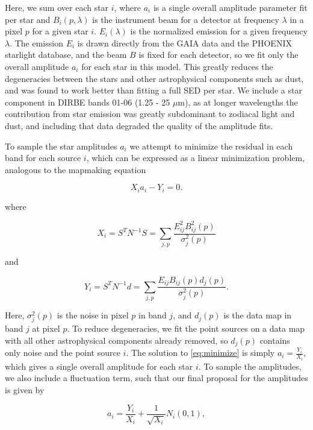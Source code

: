 \documentclass{aa}
\begin{document}
Here, we sum over each star $i$, where $a_i$ is a single overall amplitude parameter fit per star and $B_i(p, \lambda)$ is the instrument beam for a detector at frequency $\lambda$ in a pixel $p$ for a given star $i$. $E_i(\lambda)$ is the normalized emission for a given frequency $\lambda$. The emission $E_i$ is drawn directly from the GAIA data and the PHOENIX starlight database, and the beam $B$ is fixed for each detector, so we fit only the overall amplitude $a_i$ for each star in this model. This greatly reduces the degeneracies between the stars and other astrophysical components such as dust, and was found to work better than fitting a full SED per star. We include a star component in DIRBE bands 01-06 (1.25 - 25 $\mu$m), as at longer wavelengths the contribution from star emission was greatly subdominant to zodiacal light and dust, and including that data degraded the quality of the amplitude fits. 

To sample the star amplitudes $a_i$ we attempt to minimize the residual in each band for each source $i$, which can be expressed as a linear minimization problem, analogous to the mapmaking equation

\begin{equation}
\label{eq:minimize}
X_ia_i - Y_i = 0.
\end{equation}

where

\begin{equation}
X_i = S^T N^{-1} S = \sum_{j,p}\frac{E_{ij}^2 B^2_{ij}(p)}{\sigma_j^2(p)} 
\end{equation}

and

\begin{equation}
Y_i = S^TN^{-1}d = \sum_{j,p} \frac{E_{ij}B_{ij}(p) d_j(p)}{\sigma_j^2(p)}.
\end{equation}

Here, $\sigma_j^2(p)$ is the noise in pixel $p$ in band $j$, and $d_j(p)$ is the data map in band $j$ at pixel $p$. To reduce degeneracies, we fit the point sources on a data map with all other astrophysical components already removed, so $d_j(p)$ contains only noise and the point source $i$. The solution to \ref{eq:minimize} is simply $a_i = \frac{Y_i}{X_i}$, which gives a single overall amplitude for each star $i$. To sample the amplitudes, we also include a fluctuation term, such that our final proposal for the amplitudes is given by

\begin{equation}
a_i = \frac{Y_i}{X_i} + \frac{1}{\sqrt{X_i}} N_i(0,1),
\end{equation}
\end{document}
